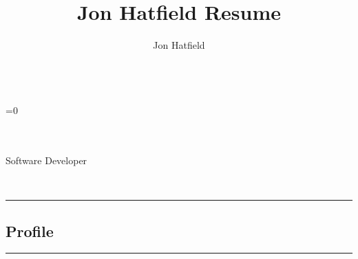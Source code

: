 \documentclass[10pt,letterpaper]{article}
\author{Jon Hatfield}
\title{Jon Hatfield Resume}
\begin{document}
\begin{center}
    {\huge \textbf{}}
    \\
    \ifnum{}=0
         \ \textbullet \ \ 
        \\
    \else
        \ \textbullet \ \ %
        \\
    \fi

    \\
    {\large Software Developer \ \ \textbullet \ \ }
\end{center}

\begin{center}
    {\large
    
    \\}
\end{center}

\hrule
\vspace{-0.4em}
\subsection*{Profile}








\hrule
\vspace{-0.4em}
\end{document}

